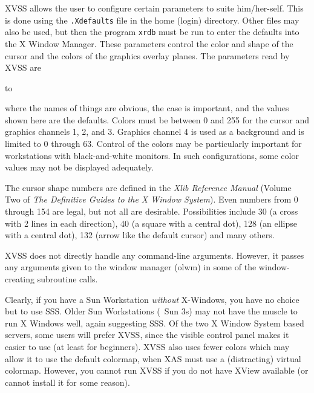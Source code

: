 XVSS allows the user to configure certain parameters to suite
him/her-self.  This is done using the {\tt .Xdefaults} file in the
home (login) directory.  Other files may also be used, but then the
program {\tt xrdb} must be run to enter the defaults into the X Window
Manager.  These parameters control the color and shape of the cursor
and the colors of the graphics overlay planes.  The parameters read by
XVSS are

\hbox to 

\noindent where the names of things are obvious, the case is
important, and the values shown here are the defaults.  Colors must be
between 0 and 255 for the cursor and graphics channels 1, 2, and 3.
Graphics channel 4 is used as a background and is limited to 0 through
63.   Control of the colors may be particularly important for
workstations with black-and-white monitors.  In such configurations,
some color values may not be displayed adequately.

The cursor shape numbers are defined in the {\it Xlib Reference
Manual} (Volume Two of {\it The Definitive Guides to the X Window
System}).  Even numbers from 0 through 154 are legal, but not all are
desirable.  Possibilities include 30 (a cross with 2 lines in each
direction), 40 (a square with a central dot), 128 (an ellipse with a
central dot), 132 (arrow like the default cursor) and many others.

XVSS does not directly handle any command-line arguments.  However, it
passes any arguments given to the window manager (olwm) in some of the
window-creating subroutine calls.


Clearly, if you have a Sun Workstation {\it without} X-Windows, you
have no choice but to use \hbox{SSS}.  Older Sun Workstations (\eg\
Sun 3s) may not have the muscle to run X Windows well, again
suggesting \hbox{SSS}.  Of the two X Window System based servers, some
users will prefer XVSS, since the visible control panel makes it
easier to use (at least for beginners).  XVSS also uses fewer colors
which may allow it to use the default colormap, when XAS must use a
(distracting) virtual colormap.  However, you cannot run XVSS if you
do not have XView available (or cannot install it for some reason).

